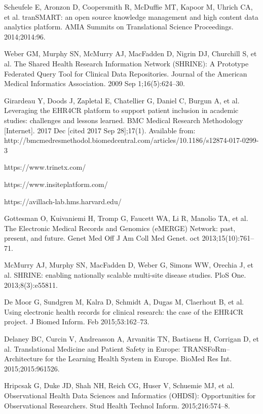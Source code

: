 \documentclass{amia}
\begin{document}


\begin{thebibliography}{1}


Scheufele E, Aronzon D, Coopersmith R, McDuffie MT, Kapoor M, Uhrich CA, et al. tranSMART: an open source knowledge management and high content data analytics platform. AMIA Summits on Translational Science Proceedings. 2014;2014:96. 

Weber GM, Murphy SN, McMurry AJ, MacFadden D, Nigrin DJ, Churchill S, et al. The Shared Health Research Information Network (SHRINE): A Prototype Federated Query Tool for Clinical Data Repositories. Journal of the American Medical Informatics Association. 2009 Sep 1;16(5):624–30. 

Girardeau Y, Doods J, Zapletal E, Chatellier G, Daniel C, Burgun A, et al. Leveraging the EHR4CR platform to support patient inclusion in academic studies: challenges and lessons learned. BMC Medical Research Methodology [Internet]. 2017 Dec [cited 2017 Sep 28];17(1). Available from: http://bmcmedresmethodol.biomedcentral.com/articles/10.1186/s12874-017-0299-3

https://www.trinetx.com/

https://www.insiteplatform.com/

https://avillach-lab.hms.harvard.edu/

Gottesman O, Kuivaniemi H, Tromp G, Faucett WA, Li R, Manolio TA, et al. The Electronic Medical Records and Genomics (eMERGE) Network: past, present, and future. Genet Med Off J Am Coll Med Genet. oct 2013;15(10):761--71.

McMurry AJ, Murphy SN, MacFadden D, Weber G, Simons WW, Orechia J, et al. SHRINE: enabling nationally scalable multi-site disease studies. PloS One. 2013;8(3):e55811.

De Moor G, Sundgren M, Kalra D, Schmidt A, Dugas M, Claerhout B, et al. Using electronic health records for clinical research: the case of the EHR4CR project. J Biomed Inform. Feb 2015;53:162--73. 

Delaney BC, Curcin V, Andreasson A, Arvanitis TN, Bastiaens H, Corrigan D, et al. Translational Medicine and Patient Safety in Europe: TRANSFoRm--Architecture for the Learning Health System in Europe. BioMed Res Int. 2015;2015:961526. 

Hripcsak G, Duke JD, Shah NH, Reich CG, Huser V, Schuemie MJ, et al. Observational Health Data Sciences and Informatics (OHDSI): Opportunities for Observational Researchers. Stud Health Technol Inform. 2015;216:574--8. 


\end{thebibliography}
\end{document}
